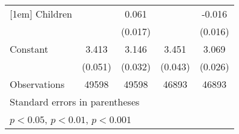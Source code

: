 {\begin{tabular}{l*{4}{c}}
[1em]
Children            &                     &       0.061\sym{***}&                     &      -0.016         \\
                    &                     &     (0.017)         &                     &     (0.016)         \\
[1em]
Constant            &       3.413\sym{***}&       3.146\sym{***}&       3.451\sym{***}&       3.069\sym{***}\\
                    &     (0.051)         &     (0.032)         &     (0.043)         &     (0.026)         \\
\hline
Observations        &       49598         &       49598         &       46893         &       46893         \\
\hline\hline
\multicolumn{5}{l}{\footnotesize Standard errors in parentheses}\\
\multicolumn{5}{l}{\footnotesize \sym{*} \(p<0.05\), \sym{**} \(p<0.01\), \sym{***} \(p<0.001\)}\\
\end{tabular}
}
